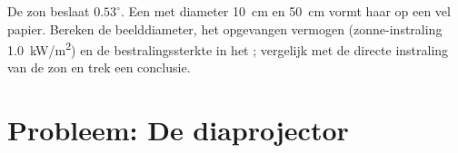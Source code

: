 \begin{exercise}[$\star\star\star$]\label{exo:b1:mirrors-thin-lenses:12}
De zon beslaat $0.53^\circ$. Een  met diameter
\qty{10}{cm} en  \qty{50}{cm} vormt haar  op een vel
papier. Bereken de beelddiameter, het opgevangen vermogen (zonne-instraling
\qty{1.0}{kW/m^2}) en de bestralingssterkte in het ; vergelijk met de
directe instraling van de zon en trek een conclusie.
\end{exercise}

\section{Probleem: De diaprojector}

